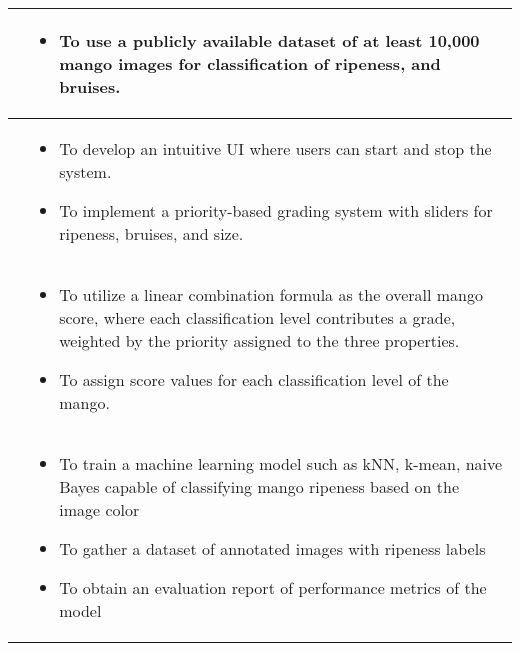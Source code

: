 \begin{table}[!htbp]
{\begin{tabular}{p{}|p{}}
			\Paste{SO2} & 
			\begin{minipage}{0.55\textwidth}
				\vspace{10pt}
				\begin{itemize}
					\item To use a publicly available dataset of at least 10,000 mango images
					 for classification of ripeness, and bruises.
				\end{itemize}
			\end{minipage} \\ \hline
						
			\Paste{SO3} & 
			\begin{minipage}{0.55\textwidth}
				\vspace{10pt}
				\begin{itemize}
					\item To develop an intuitive UI where users can start and stop the system.
					\item To implement a priority-based grading system with sliders for ripeness, bruises, and size.
				\end{itemize}
			\end{minipage} \\ \hline
						
			\Paste{SO4} & 
			\begin{minipage}{0.55\textwidth}
				\vspace{10pt}
				\begin{itemize}
					\item To utilize a linear combination formula as the overall mango score, where each classification level 
					contributes a grade, weighted by the priority assigned to the three properties.
					\item To assign score values for each classification level of the mango.
				\end{itemize}
			\end{minipage} \\ \hline
		

			\Paste{SO5} & 
			\begin{minipage}{0.55\textwidth}
				\vspace{10pt}
				\begin{itemize}
					\item To train a machine learning model such as kNN, k-mean, naive Bayes capable
					of classifying mango ripeness based on the image color
					\item To gather a dataset of annotated images with ripeness labels
					\item To obtain an evaluation report of performance metrics of the model
				\end{itemize}
			\end{minipage} \\ \hline

			
		\end{tabular}	
			
	}
\end{table}



